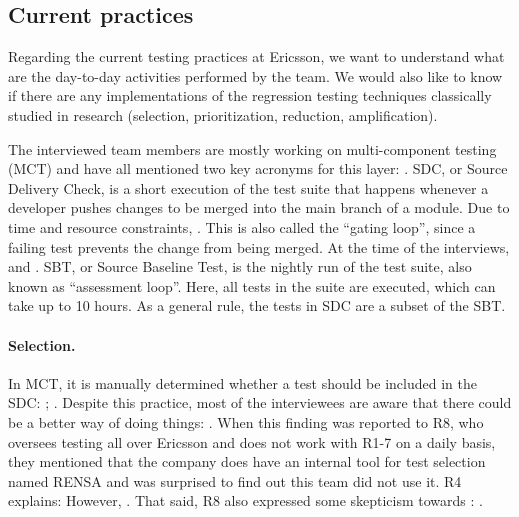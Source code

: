 \subsection{Current practices}

Regarding the current testing practices at Ericsson, we want to understand what are the day-to-day activities performed by the team.
We would also like to know if there are any implementations of the regression testing techniques classically studied in research (selection, prioritization, reduction, amplification).

The interviewed team members are mostly working on multi-component testing (MCT) and have all mentioned two key acronyms for this layer: .
SDC, or Source Delivery Check, is a short execution of the test suite that happens whenever a developer pushes changes to be merged into the main branch of a module.
Due to time and resource constraints, .
This is also called the ``gating loop'', since a failing test prevents the change from being merged.
At the time of the interviews,  and .
SBT, or Source Baseline Test, is the nightly run of the test suite, also known as ``assessment loop''.
Here, all tests in the suite are executed, which can take up to 10 hours.
As a general rule, the tests in SDC are a subset of the SBT.

\paragraph{Selection.} In MCT, it is manually determined whether a test should be included in the SDC: ; .
Despite this practice, most of the interviewees are aware that there could be a better way of doing things: .
When this finding was reported to R8, who oversees testing all over Ericsson and does not work with R1-7 on a daily basis, they mentioned that the company does have an internal tool for test selection named RENSA and was surprised to find out this team did not use it.
R4 explains:  
However, .
That said, R8 also expressed some skepticism towards \tcs: .

